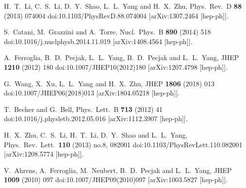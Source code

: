 \documentclass{PoS}
\begin{document}
\begin{thebibliography}{99}
  H.~T.~Li, C.~S.~Li, D.~Y.~Shao, L.~L.~Yang and H.~X.~Zhu,
  Phys.\ Rev.\ D {\bf 88} (2013) 074004
  doi:10.1103/PhysRevD.88.074004
  [arXiv:1307.2464 [hep-ph]].

  S.~Catani, M.~Grazzini and A.~Torre,
  Nucl.\ Phys.\ B {\bf 890} (2014) 518
  doi:10.1016/j.nuclphysb.2014.11.019
  [arXiv:1408.4564 [hep-ph]].

  A.~Ferroglia, B.~D.~Pecjak, L.~L.~Yang, B.~D.~Pecjak and L.~L.~Yang,
  JHEP {\bf 1210} (2012) 180
  doi:10.1007/JHEP10(2012)180
  [arXiv:1207.4798 [hep-ph]].

  G.~Wang, X.~Xu, L.~L.~Yang and H.~X.~Zhu,
  JHEP {\bf 1806} (2018) 013
  doi:10.1007/JHEP06(2018)013
  [arXiv:1804.05218 [hep-ph]].

  T.~Becher and G.~Bell,
  Phys.\ Lett.\ B {\bf 713} (2012) 41
  doi:10.1016/j.physletb.2012.05.016
  [arXiv:1112.3907 [hep-ph]].

  H.~X.~Zhu, C.~S.~Li, H.~T.~Li, D.~Y.~Shao and L.~L.~Yang,
  Phys.\ Rev.\ Lett.\  {\bf 110} (2013) no.8,  082001
  doi:10.1103/PhysRevLett.110.082001
  [arXiv:1208.5774 [hep-ph]].

  V.~Ahrens, A.~Ferroglia, M.~Neubert, B.~D.~Pecjak and L.~L.~Yang,
  JHEP {\bf 1009} (2010) 097
  doi:10.1007/JHEP09(2010)097
  [arXiv:1003.5827 [hep-ph]].


\end{thebibliography}
\end{document}

